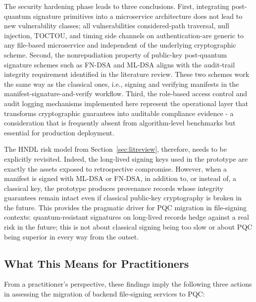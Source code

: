 \documentclass[12pt,a4paper]{article}
\begin{document}
The security hardening phase leads to three conclusions. First, integrating post-quantum signature primitives into a microservice architecture does not lead to new vulnerability classes; all vulnerabilities considered-path traversal, null injection, TOCTOU, and timing side channels on authentication-are generic to any file-based microservice and independent of the underlying cryptographic scheme. Second, the nonrepudiation property of public-key post-quantum signature schemes such as FN-DSA and ML-DSA aligns with the audit-trail integrity requirement identified in the literature review. These two schemes work the same way as the classical ones, i.e., signing and verifying manifests in the manifest-signature-and-verify workflow. Third, the role-based access control and audit logging mechanisms implemented here represent the operational layer that transforms cryptographic guarantees into auditable compliance evidence - a consideration that is frequently absent from algorithm-level benchmarks but essential for production deployment.

The HNDL risk model from Section~\ref{sec:litreview}, therefore, needs to be explicitly revisited. Indeed, the long-lived signing keys used in the prototype are exactly the assets exposed to retrospective compromise. However, when a manifest is signed with ML-DSA or FN-DSA, in addition to, or instead of, a classical key, the prototype produces provenance records whose integrity guarantees remain intact even if classical public-key cryptography is broken in the future. This provides the pragmatic driver for PQC migration in file-signing contexts: quantum-resistant signatures on long-lived records hedge against a real risk in the future; this is not about classical signing being too slow or about PQC being superior in every way from the outset.

\subsection{What This Means for Practitioners}
\label{sec:discussion:synthesis}

From a practitioner's perspective, these findings imply the following three actions in assessing the migration of backend file-signing services to PQC:
\end{document}
